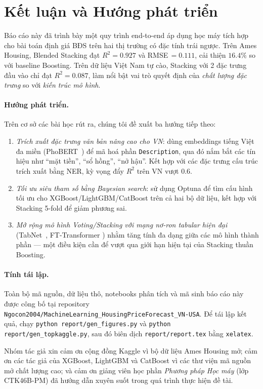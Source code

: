 \documentclass[sigconf,nonacm]{acmart}
\begin{document}
\section{Kết luận và Hướng phát triển}\label{sec:conclusion}

Báo cáo này đã trình bày một quy trình end-to-end áp dụng học máy
tích hợp cho bài toán định giá BĐS trên hai thị trường có đặc tính
trái ngược. Trên Ames Housing, Blended Stacking đạt
$R^2 = 0.927$ và RMSE\,$=0.111$, cải thiện $16.4\%$ so với baseline
Boosting. Trên dữ liệu Việt Nam tự cào, Stacking với 2 đặc trưng đầu
vào chỉ đạt $R^2 = 0.087$, làm nổi bật vai trò quyết định của
\emph{chất lượng đặc trưng} so với \emph{kiến trúc mô hình}.

\paragraph{Hướng phát triển.}
Trên cơ sở các bài học rút ra, chúng tôi đề xuất ba hướng tiếp theo:

\begin{enumerate}
\item \emph{Trích xuất đặc trưng văn bản nâng cao cho VN}: dùng
  embeddings tiếng Việt đa miền (PhoBERT~\cite{nguyen2020phobert})
  để mã hoá phần \texttt{Description}, qua đó nắm bắt các tín hiệu
  như ``mặt tiền'', ``sổ hồng'', ``nở hậu''. Kết hợp với các đặc
  trưng cấu trúc trích xuất bằng NER, kỳ vọng đẩy $R^2$ trên VN
  vượt $0.6$.
\item \emph{Tối ưu siêu tham số bằng Bayesian search}: sử dụng
  Optuna để tìm cấu hình tối ưu cho XGBoost/LightGBM/CatBoost trên
  cả hai bộ dữ liệu, kết hợp với Stacking 5-fold để giảm phương sai.
\item \emph{Mở rộng mô hình Voting/Stacking với mạng nơ-ron tabular
  hiện đại} (TabNet~\cite{arik2021tabnet}, FT-Transformer
  \cite{gorishniy2021revisiting}) nhằm tăng tính đa dạng giữa các
  mô hình thành phần --- một điều kiện cần để vượt qua giới hạn
  hiện tại của Stacking thuần Boosting.
\end{enumerate}

\paragraph{Tính tái lập.}
Toàn bộ mã nguồn, dữ liệu thô, notebooks phân tích và mã sinh báo
cáo này được công bố tại repository
\texttt{Ngocon2004/MachineLearning\_HousingPriceForecast\_VN-USA}.
Để tái lập kết quả, chạy \texttt{python report/gen\_figures.py} và
\texttt{python report/gen\_topkaggle.py}, sau đó biên dịch
\texttt{report/report.tex} bằng \texttt{xelatex}.

\begin{acks}
Nhóm tác giả xin cảm ơn cộng đồng Kaggle vì bộ dữ liệu Ames Housing
mở; cảm ơn các tác giả của XGBoost, LightGBM và CatBoost vì các thư
viện mã nguồn mở chất lượng cao; và cảm ơn giảng viên học phần
\emph{Phương pháp Học máy} (lớp CTK46B-PM) đã hướng dẫn xuyên suốt
trong quá trình thực hiện đề tài.
\end{acks}



\end{document}
